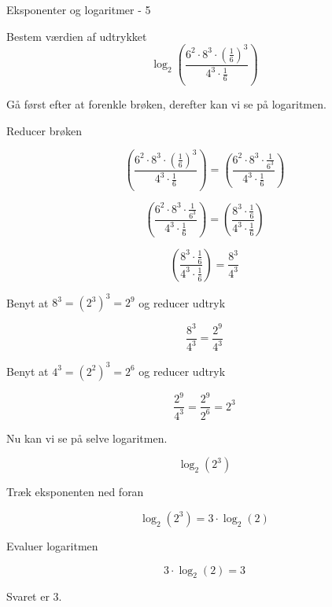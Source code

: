 \documentclass{article}
\begin{document}
\newpage
\begin{exercise}{Eksponenter og logaritmer - 5}

Bestem værdien af udtrykket
\[
\log_2\left(\frac{6^2 \cdot 8^3 \cdot \left( \frac{1}{6}\right)^3}{4^3 \cdot \frac{1}{6}} \right)
\]


\hint
Gå først efter at forenkle brøken, derefter kan vi se på logaritmen.

\hint
Reducer brøken

\hint
\[
\left(\frac{6^2 \cdot 8^3 \cdot \left( \frac{1}{6}\right)^3}{4^3 \cdot \frac{1}{6}} \right) =
\left(\frac{6^2 \cdot 8^3 \cdot \frac{1}{6^3}}{4^3 \cdot \frac{1}{6}} \right)
\]

\hint
\[
\left(\frac{6^2 \cdot 8^3 \cdot \frac{1}{6^3}}{4^3 \cdot \frac{1}{6}} \right) =
\left(\frac{8^3 \cdot \frac{1}{6}}{4^3 \cdot \frac{1}{6}} \right)
\]

\hint
\[
\left(\frac{8^3 \cdot \frac{1}{6}}{4^3 \cdot \frac{1}{6}} \right) = \frac{8^3}{4^3}
\]

\hint
Benyt at $8^3=(2^3)^3 = 2^9$ og reducer udtryk

\hint
\[
\frac{8^3}{4^3} = \frac{2^9}{4^3}
\]

\hint
Benyt at $4^3=(2^2)^3 = 2^6$ og reducer udtryk

\hint
\[
\frac{2^9}{4^3} = \frac{2^9}{2^6} = 2^3
\]


\hint
Nu kan vi se på selve logaritmen.

\hint
\[
\log_2\left(2^3\right)
\]


\hint
Træk eksponenten ned foran

\hint
\[
\log_2\left(2^{3}\right) = 3 \cdot \log_2(2)
\]

\hint
Evaluer logaritmen

\hint
\[
3 \cdot \log_2(2) = 3
\]

\hint
Svaret er $3$.

\end{exercise}
\end{document}
